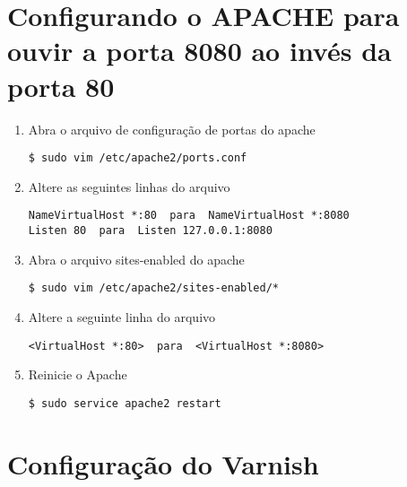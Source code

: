 \section{Configurando o APACHE para ouvir a porta 8080 ao invés da porta 80}
\begin{enumerate}[label=\alph*)]

\item Abra o arquivo de configuração de portas do apache
\begin{lstlisting}
$ sudo vim /etc/apache2/ports.conf
\end{lstlisting}

\item Altere as seguintes linhas do arquivo
\begin{lstlisting}
NameVirtualHost *:80  para  NameVirtualHost *:8080
Listen 80  para  Listen 127.0.0.1:8080
\end{lstlisting}

\item Abra o arquivo sites-enabled do apache
\begin{lstlisting}
$ sudo vim /etc/apache2/sites-enabled/*
\end{lstlisting}

\item Altere a seguinte linha do arquivo
\begin{lstlisting}
<VirtualHost *:80>  para  <VirtualHost *:8080>
\end{lstlisting}

\item Reinicie o Apache
\begin{lstlisting}
$ sudo service apache2 restart
\end{lstlisting}

\end{enumerate}

\section{Configuração do Varnish}

